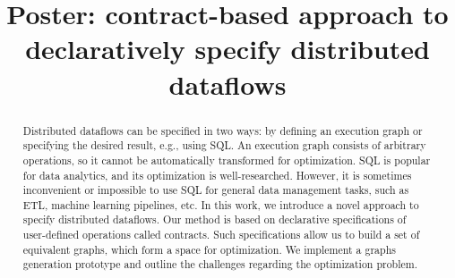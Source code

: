 \documentclass[sigconf]{acmart}
\theoremstyle{remark}
\begin{document}

\title{Poster: contract-based approach to \\declaratively specify distributed dataflows}



\begin{abstract}
    Distributed dataflows can be specified in two ways: by defining an execution graph or specifying the desired result, e.g., using SQL.
    An execution graph consists of arbitrary operations, so it cannot be automatically transformed for optimization.
    SQL is popular for data analytics, and its optimization is well-researched.
    However, it is sometimes inconvenient or impossible to use SQL for general data management tasks, such as ETL, machine learning pipelines, etc.
    In this work, we introduce a novel approach to specify distributed dataflows.
    Our method is based on declarative specifications of user-defined operations called contracts.
    Such specifications allow us to build a set of equivalent graphs, which form a space for optimization.
    We implement a graphs generation prototype and outline the challenges regarding the optimization problem.
\end{abstract}
\end{document}
